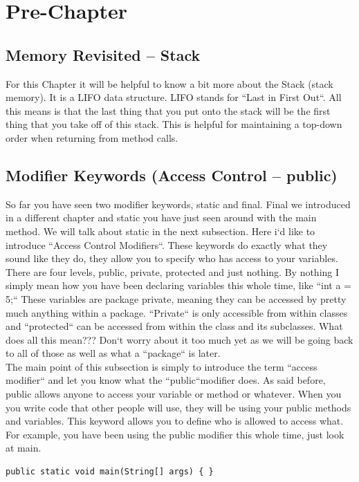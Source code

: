 \documentclass[11]{article}
\begin{document}
\section{Pre-Chapter}
\subsection{Memory Revisited -- Stack}
For this Chapter it will be helpful to know a bit more about the Stack (stack memory). It is a LIFO data structure. LIFO stands for ``Last in First Out``. All this means is that the last thing that you put onto the stack will be the first thing that you take off of this stack. This is helpful for maintaining a top-down order when returning from method calls. 

\subsection{Modifier Keywords (Access Control -- public)}
\label{sec:mods}
So far you have seen two modifier keywords, static and final. Final we introduced in a different chapter and static you have just seen around with the main method. We will talk about static in the next subsection. Here i`d like to introduce ``Access Control Modifiers``. These keywords do exactly what they sound like they do, they allow you to specify who has access to your variables. There are four levels, public, private, protected and just nothing. By nothing I simply mean how you have been declaring variables this whole time, like ``int a = 5;`` These variables are package private, meaning they can be accessed by pretty much anything within a package. ``Private`` is only accessible from within classes and ``protected`` can be accessed from within the class and its subclasses. What does all this mean??? Don`t worry about it too much yet as we will be going back to all of those as well as what a ``package`` is later.\\

The main point of this subsection is simply to introduce the term ``access modifier`` and let you know what the ``public``modifier does. As said before, public allows anyone to access your variable or method or whatever. When you you write code that other people will use, they will be using your public methods and variables. This keyword allows you to define who is allowed to access what.\\

For example, you have been using the public modifier this whole time, just look at main.
\begin{lstlisting}
public static void main(String[] args) { }
\end{lstlisting}
\end{document}
